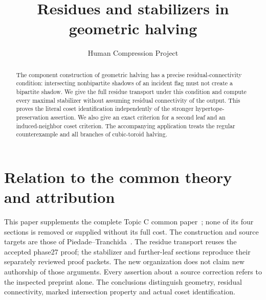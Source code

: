 
\title{Residues and stabilizers in geometric halving}
\author{Human Compression Project}\date{}
\maketitle
\begin{abstract}
The component construction of geometric halving has a precise
residual-connectivity condition: intersecting nonbipartite shadows of
an incident flag must not create a bipartite shadow. We give the full
residue transport under this condition and compute every maximal
stabilizer without assuming residual connectivity of the output.
This proves the literal coset identification independently of the
stronger hypertope-preservation assertion. We also give an exact
criterion for a second leaf and an induced-neighbor coset criterion.
The accompanying application treats the regular counterexample and
all branches of cubic-toroid halving.
\end{abstract}
\section*{Relation to the common theory and attribution}
This paper supplements the complete Topic C common paper~\cite{OldCommon};
none of its four sections is removed or supplied without its full cost.
The construction and source targets are those of Piedade--Tranchida~\cite{PT}.
The residue transport reuses the accepted phase27 proof; the stabilizer
and further-leaf sections reproduce their separately reviewed proof
packets. The new organization does not claim new authorship of those
arguments. Every assertion about a source correction refers to the
inspected preprint alone. The conclusions distinguish geometry,
residual connectivity, marked intersection property and actual
coset identification.

\par\medskip

\par\medskip



